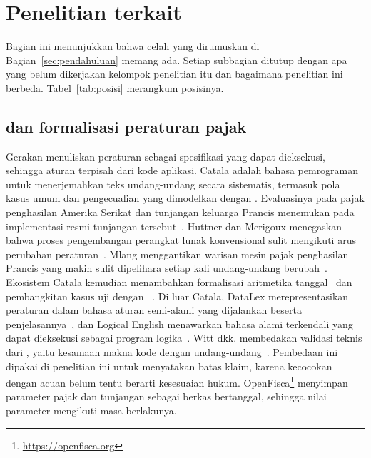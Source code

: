 \section{Penelitian terkait}
\label{sec:terkait}

Bagian ini menunjukkan bahwa celah yang dirumuskan di Bagian~\ref{sec:pendahuluan} memang ada. Setiap subbagian ditutup dengan apa yang belum dikerjakan kelompok penelitian itu dan bagaimana penelitian ini berbeda. Tabel~\ref{tab:posisi} merangkum posisinya.

\subsection{ dan formalisasi peraturan pajak}
\label{subsec:rac}

Gerakan  menuliskan peraturan sebagai spesifikasi yang dapat dieksekusi, sehingga aturan terpisah dari kode aplikasi. Catala adalah bahasa pemrograman untuk menerjemahkan teks undang-undang secara sistematis, termasuk pola kasus umum dan pengecualian yang dimodelkan dengan . Evaluasinya pada pajak penghasilan Amerika Serikat dan tunjangan keluarga Prancis menemukan  pada implementasi resmi tunjangan tersebut~\cite{merigoux2021catala}. Huttner dan Merigoux menegaskan bahwa proses pengembangan perangkat lunak konvensional sulit mengikuti arus perubahan peraturan~\cite{huttner2022catala}. Mlang menggantikan  warisan mesin pajak penghasilan Prancis yang makin sulit dipelihara setiap kali undang-undang berubah~\cite{merigoux2021mlang}. Ekosistem Catala kemudian menambahkan formalisasi aritmetika tanggal~\cite{monat2024date} dan pembangkitan kasus uji dengan ~\cite{goutagny2025cutecat}. Di luar Catala, DataLex merepresentasikan peraturan dalam bahasa aturan semi-alami yang dijalankan  beserta penjelasannya~\cite{mowbray2023scaling,mowbray2023xai}, dan Logical English menawarkan bahasa alami terkendali yang dapat dieksekusi sebagai program logika~\cite{kowalski2022logicalenglish}. Witt dkk. membedakan validasi teknis dari , yaitu kesamaan makna kode dengan undang-undang~\cite{witt2024encoding}. Pembedaan ini dipakai di penelitian ini untuk menyatakan batas klaim, karena kecocokan dengan acuan belum tentu berarti kesesuaian hukum. OpenFisca\footnote{\url{https://openfisca.org}} menyimpan parameter pajak dan tunjangan sebagai berkas bertanggal, sehingga nilai parameter mengikuti masa berlakunya.


